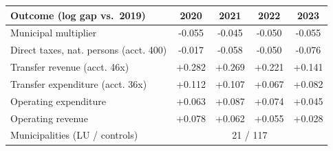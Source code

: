 \begin{tabular}{lcccc}
\toprule
Outcome (log gap vs.\ 2019) & 2020 & 2021 & 2022 & 2023 \\
\midrule
Municipal multiplier & -0.055 & -0.045 & -0.050 & -0.055 \\
Direct taxes, nat. persons (acct. 400) & -0.017 & -0.058 & -0.050 & -0.076 \\
Transfer revenue (acct. 46x) & +0.282 & +0.269 & +0.221 & +0.141 \\
Transfer expenditure (acct. 36x) & +0.112 & +0.107 & +0.067 & +0.082 \\
Operating expenditure & +0.063 & +0.087 & +0.074 & +0.045 \\
Operating revenue & +0.078 & +0.062 & +0.055 & +0.028 \\
\midrule
Municipalities (LU / controls) & \multicolumn{4}{c}{21 / 117} \\
\bottomrule
\end{tabular}
